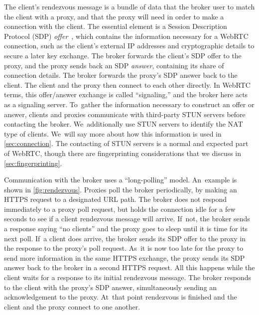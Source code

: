 \documentclass[letterpaper,twocolumn]{article}
\newcommand{\firstterm}[1]{\textit{#1}}
\begin{document}
The client's rendezvous message
is a bundle of data that the broker user to match the client with a proxy,
and that the proxy will need in order to make a connection with the client.
The essential element is a
Session Description Protocol (SDP) \firstterm{offer}~\cite{rfc8839},
which contains the information necessary for a WebRTC connection,
such as the client's external IP addresses
and cryptographic details to secure a later key exchange.
The broker forwards the client's SDP offer to the proxy,
and the proxy sends back an SDP \firstterm{answer},
containing its share of connection details.
The broker forwards the proxy's SDP answer back to the client.
The client and the proxy then connect to each other directly.
In WebRTC terms, this offer/\allowbreak answer exchange is called
``signaling,'' and the broker here acts as a signaling server.
To~gather the information necessary to construct an offer or answer,
clients and proxies communicate with third-party STUN servers
before contacting the broker.
We~additionally use STUN servers to identify the NAT type of clients.
We~will say more about how this information is used in \autoref{sec:connection}.
The contacting of STUN servers is a normal and expected part of WebRTC,
though there are fingerprinting considerations
that we discuss in \autoref{sec:fingerprinting}.

Communication with the broker uses a ``long-polling'' model.
An~example is shown in \autoref{fig:rendezvous}.
Proxies poll the broker periodically,
by making an HTTPS request to a designated URL path.
The broker does not respond immediately to a proxy poll request,
but holds the connection idle for a few seconds
to see if a client rendezvous message will arrive.
If~not, the broker sends a response saying ``no clients''
and the proxy goes to sleep until it is time for its next poll.
If~a client does arrive,
the broker sends its SDP offer to the proxy
in the response to the proxy's poll request.
As~it is now too late for the proxy to send more information
in the same HTTPS exchange,
the proxy sends its SDP answer back to the broker
in a second HTTPS request.
All this happens while the client waits for a response
to its initial rendezvous message.
The broker responds to the client with the proxy's SDP answer,
simultaneously sending an acknowledgement to the proxy.
At~that point rendezvous is finished
and the client and the proxy connect to one another.
\end{document}
